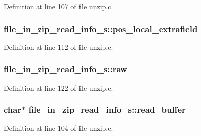 Definition at line 107 of file unzip.\-c.

\hypertarget{structfile__in__zip__read__info__s_aa07cf3d7d5d68e9537ffe99499d7db6f}{
\subsubsection[{pos\-\_\-local\-\_\-extrafield}]{ file\-\_\-in\-\_\-zip\-\_\-read\-\_\-info\-\_\-s\-::pos\-\_\-local\-\_\-extrafield}}\label{structfile__in__zip__read__info__s_aa07cf3d7d5d68e9537ffe99499d7db6f}


Definition at line 112 of file unzip.\-c.

\hypertarget{structfile__in__zip__read__info__s_aec0649000ce059ef1262b5a5be1641fe}{
\subsubsection[{raw}]{ file\-\_\-in\-\_\-zip\-\_\-read\-\_\-info\-\_\-s\-::raw}}\label{structfile__in__zip__read__info__s_aec0649000ce059ef1262b5a5be1641fe}


Definition at line 122 of file unzip.\-c.

\hypertarget{structfile__in__zip__read__info__s_a6310a19e33ac2cf3280aa74199cbd89b}{
\subsubsection[{read\-\_\-buffer}]{\setlength{\rightskip}{0pt plus 5cm}char$\ast$ file\-\_\-in\-\_\-zip\-\_\-read\-\_\-info\-\_\-s\-::read\-\_\-buffer}}\label{structfile__in__zip__read__info__s_a6310a19e33ac2cf3280aa74199cbd89b}


Definition at line 104 of file unzip.\-c.


